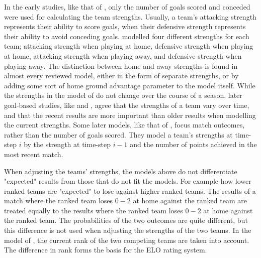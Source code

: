 In the early studies, like that of \citet{bib:maher-1982}, only the number of goals scored and conceded were used for calculating the team strengths. Usually, a team's attacking strength represents their ability to score goals, when their defensive strength represents their ability to avoid conceding goals. \citet{bib:maher-1982} modelled four different strengths for each team; attacking strength when playing at home, defensive strength when playing at home, attacking strength when playing away, and defensive strength when playing away. The distinction between home and away strengths is found in almost every reviewed model, either in the form of separate strengths, or by adding some sort of home ground advantage parameter to the model itself. While the strengths in the model of \citet{bib:maher-1982} do not change over the course of a season, later goal-based studies, like \citet{bib:dixon-coles-1997} and \citet{bib:rue-salvesen-2000}, agree that the strengths of a team vary over time, and that the recent results are more important than older results when modelling the current strengths. Some later models, like that of \citet{bib:cattelan-varin-firth-2013}, focus match outcomes, rather than the number of goals scored. They model a team's strengths at time-step $i$ by the strength at time-step $i-1$ and the number of points achieved in the most recent match.

When adjusting the teams' strengths, the models above do not differentiate "expected" results from those that do not fit the models. For example how lower ranked teams are "expected" to lose against higher ranked teams. The results of a match where the  ranked team loses $0-2$ at home against the  ranked team are treated equally to the results where the  ranked team loses $0-2$ at home against the  ranked team. The probabilities of the two outcomes are quite different, but this difference is not used when adjusting the strengths of the two teams. In the model of \citet{bib:hvattum-arntzen-2010}, the current rank of the two competing teams are taken into account. The difference in rank forms the basis for the ELO rating system.

